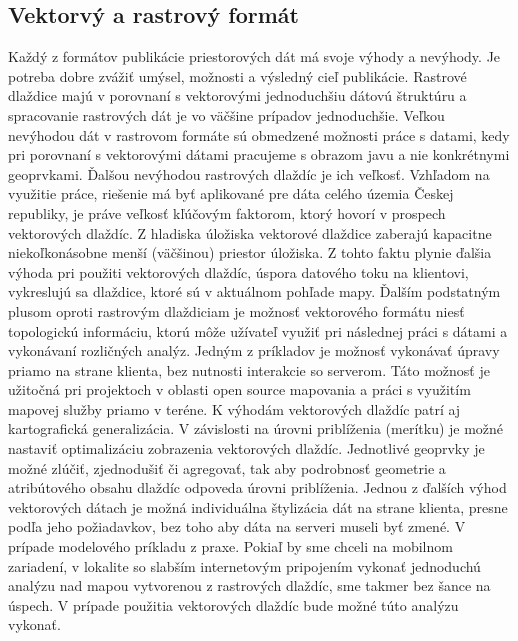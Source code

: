 \documentclass[12pt]{article}
\begin{document}
\subsection{Vektorvý a rastrový formát}
Každý z formátov publikácie priestorových dát má svoje výhody a nevýhody. Je potreba dobre zvážiť umýsel, možnosti a výsledný cieľ publikácie. Rastrové dlaždice majú v porovnaní s vektorovými jednoduchšiu dátovú štruktúru a spracovanie rastrových dát je vo väčšine prípadov jednoduchšie. Veľkou nevýhodou dát v rastrovom formáte sú obmedzené možnosti práce s datami, kedy pri porovnaní s vektorovými dátami pracujeme s obrazom javu a nie konkrétnymi geoprvkami. Ďalšou nevýhodou rastrových dlaždíc je ich veľkosť. Vzhľadom na využitie práce, riešenie má byť aplikované pre dáta celého územia Českej republiky, je práve veľkosť kľúčovým faktorom, ktorý hovorí v prospech vektorových dlaždíc. Z hladiska úložiska vektorové dlaždice zaberajú kapacitne niekoľkonásobne menší (väčšinou) priestor úložiska. Z tohto faktu plynie ďalšia výhoda pri použiti vektorových dlaždíc, úspora datového toku na klientovi, vykreslujú sa dlaždice, ktoré sú v aktuálnom pohľade mapy. 
\newline Ďalším podstatným plusom oproti rastrovým dlaždiciam je možnosť vektorového formátu niesť topologickú informáciu, ktorú môže užívateľ využiť pri následnej práci s dátami a vykonávaní rozličných analýz. Jedným z príkladov je možnosť vykonávať úpravy priamo na strane klienta,  bez nutnosti interakcie so serverom. Táto možnosť je užitočná pri projektoch v oblasti open source mapovania a práci s využitím mapovej služby priamo v teréne. 
\newline K výhodám vektorových dlaždíc patrí aj kartografická generalizácia. V závislosti na úrovni priblíženia (merítku) je možné nastaviť optimalizáciu zobrazenia vektorových dlaždíc. Jednotlivé geoprvky je možné zlúčiť, zjednodušiť či agregovať, tak aby podrobnosť geometrie a atribútového obsahu dlaždíc odpoveda úrovni priblíženia.
\newline Jednou z ďalších výhod vektorových dátach je možná individuálna štylizácia dát na strane klienta, presne podľa jeho požiadavkov, bez toho aby dáta na serveri museli byť zmené.
\newline V prípade modelového príkladu z praxe. Pokiaľ by sme chceli na mobilnom zariadení, v lokalite so slabším internetovým pripojením vykonať jednoduchú analýzu nad mapou vytvorenou z rastrových dlaždíc, sme takmer bez šance na úspech. V prípade použitia vektorových dlaždíc bude možné túto analýzu vykonať.
\end{document}

